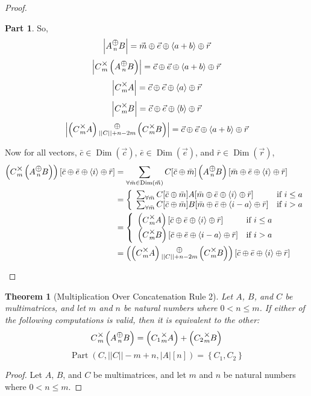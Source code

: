 \documentclass[12pt]{book}
\theoremstyle{plain}
\newtheorem{theorem}{Theorem}[chapter]
\theoremstyle{definition}
\theoremstyle{ppart}
\newtheorem{ppart}{Part}
\theoremstyle{case}
\theoremstyle{solution}
\DeclareMathOperator{\Dim}{Dim}
\DeclareMathOperator{\Part}{Part}
\newcommand{\mmult}[1]{\text{\raisebox{1ex}{$\underset{#1}{\times}$}}}
\newcommand{\mconcat}[1]{\text{\raisebox{1ex}{$\underset{#1}{\oplus}$}}}
\newcommand{\shape}[1]{\left|#1\right|}
\begin{document}
\begin{landscape}
\begin{proof}
\begin{ppart}
So,
\[ \shape{A \mconcat{n} B} = \vec{m} \oplus \vec{e} \oplus \left<a+b\right> \oplus \vec{r} \]
\[ \shape{C \mmult{m} \left(A \mconcat{n} B\right)} = \vec{c} \oplus \vec{e} \oplus \left<a+b\right> \oplus \vec{r} \]
\[ \shape{C \mmult{m} A} = \vec{c} \oplus \vec{e} \oplus \left<a\right> \oplus \vec{r} \]
\[ \shape{C \mmult{m} B} = \vec{c} \oplus \vec{e} \oplus \left<b\right> \oplus \vec{r} \]
\[ \shape{\left(C \mmult{m} A\right) \mconcat{\shape{\shape{C}}+n-2m} \left(C \mmult{m} B\right)} = \vec{c} \oplus \vec{e} \oplus \left<a+b\right> \oplus \vec{r} \]

Now for all vectors, $\bar{c} \in \Dim(\vec{c})$, $\bar{e} \in \Dim(\vec{e})$, and $\bar{r} \in \Dim(\vec{r})$,
\begin{align*}
  \left(C \mmult{m} \left(A \mconcat{n} B\right)\right)[\bar{c} \oplus \bar{e} \oplus \left<i\right> \oplus \bar{r}]
  &= \sum_{\forall \bar{m} \in \Dim(\vec{m})} C[\bar{c} \oplus \bar{m}] \left(A \mconcat{n} B\right)[\bar{m} \oplus \bar{e} \oplus \left<i\right> \oplus \bar{r}] \\
  &= \left\{
    \begin{array}{ll}
      \sum_{\forall \bar{m}} C[\bar{c} \oplus \bar{m}] A[\bar{m} \oplus \bar{e} \oplus \left<i\right> \oplus \bar{r}]
      & \mbox{if } i \le a \\
      \sum_{\forall \bar{m}} C[\bar{c} \oplus \bar{m}] B[\bar{m} \oplus \bar{e} \oplus \left<i-a\right> \oplus \bar{r}]
      & \mbox{if } i > a
    \end{array}
  \right. \\
  &= \left\{
    \begin{array}{ll}
      \left(C \mmult{m} A\right)[\bar{c} \oplus \bar{e} \oplus \left<i\right> \oplus \bar{r}]
      & \mbox{if } i \le a \\
      \left(C \mmult{m} B\right)[\bar{c} \oplus \bar{e} \oplus \left<i-a\right> \oplus \bar{r}]
      & \mbox{if } i > a
    \end{array}
  \right. \\
  &= \left(\left(C \mmult{m} A\right) \mconcat{\shape{\shape{C}}+n-2m} \left(C \mmult{m} B\right)\right)[\bar{c} \oplus \bar{e} \oplus \left<i\right> \oplus \bar{r}]
\end{align*}
\end{ppart}

\end{proof}

\begin{theorem}[Multiplication Over Concatenation Rule 2]
Let $A$, $B$, and $C$ be multimatrices, and let $m$ and $n$ be
natural numbers where $0 < n \le m$. 
If either of the following computations is valid, then it is equivalent to the other:
\[
  C \mmult{m} \left(A \mconcat{n} B\right)
  =
  \left( C_1 \mmult{m} A \right) + 
  \left( C_2 \mmult{m} B \right)
\]
\[ \Part(C, \shape{\shape{C}}-m+n, \shape{A}[n]) = \left\{ C_1, C_2 \right\} \]
\end{theorem}
\begin{proof}
Let $A$, $B$, and $C$ be multimatrices, and let $m$ and $n$ be
natural numbers where $0 < n \le m$. 


\end{proof}
\end{landscape}
\end{document}
